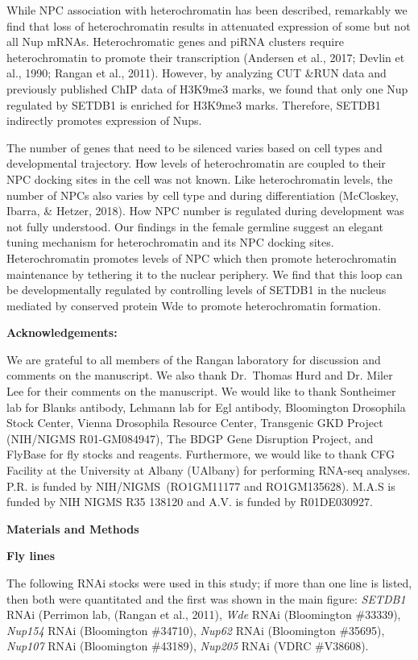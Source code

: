 \documentclass[12pt,oneside]{reedthesis}
\begin{document}
While NPC association with heterochromatin has been described,
remarkably we find that loss of heterochromatin results in attenuated
expression of some but not all Nup mRNAs. Heterochromatic genes and
piRNA clusters require heterochromatin to promote their transcription
(Andersen et al., 2017; Devlin et al., 1990; Rangan et al., 2011). However, by analyzing CUT \&RUN
data and previously published ChIP data of H3K9me3 marks, we found that
only one Nup regulated by SETDB1 is enriched for H3K9me3 marks.
Therefore, SETDB1 indirectly promotes expression of Nups.

The number of genes that need to be silenced varies based on cell types
and developmental trajectory. How levels of heterochromatin are coupled
to their NPC docking sites in the cell was not known. Like
heterochromatin levels, the number of NPCs also varies by cell type and
during differentiation (McCloskey, Ibarra, \& Hetzer, 2018). How NPC
number is regulated during development was not fully understood. Our
findings in the female germline suggest an elegant tuning mechanism for
heterochromatin and its NPC docking sites. Heterochromatin promotes
levels of NPC which then promote heterochromatin maintenance by
tethering it to the nuclear periphery. We find that this loop can be
developmentally regulated by controlling levels of SETDB1 in the nucleus
mediated by conserved protein Wde to promote heterochromatin formation.

\textbf{Acknowledgements:}

We are grateful to all members of the Rangan laboratory for discussion
and comments on the manuscript. We also thank Dr.~Thomas Hurd and Dr.
Miler Lee for their comments on the manuscript. We would like to thank
Sontheimer lab for Blanks antibody, Lehmann lab for Egl antibody,
Bloomington Drosophila Stock Center, Vienna Drosophila Resource Center,
Transgenic GKD Project (NIH/NIGMS R01-GM084947), The BDGP Gene
Disruption Project, and FlyBase for fly stocks and reagents.
Furthermore, we would like to thank CFG Facility at the University at
Albany (UAlbany) for performing RNA-seq analyses. P.R. is funded by
NIH/NIGMS~(RO1GM11177 and RO1GM135628). M.A.S is funded by NIH NIGMS R35
138120 and A.V. is funded by R01DE030927.

\textbf{Materials and Methods}

\textbf{Fly lines}

The following RNAi stocks were used in this study; if more than one line
is listed, then both were quantitated and the first was shown in the
main figure: \emph{SETDB1} RNAi (Perrimon lab,
(Rangan et al., 2011), \emph{Wde} RNAi (Bloomington
\#33339), \emph{Nup154} RNAi (Bloomington \#34710), \emph{Nup62} RNAi (Bloomington
\#35695), \emph{Nup107} RNAi (Bloomington \#43189), \emph{Nup205} RNAi (VDRC
\#V38608).
\end{document}
